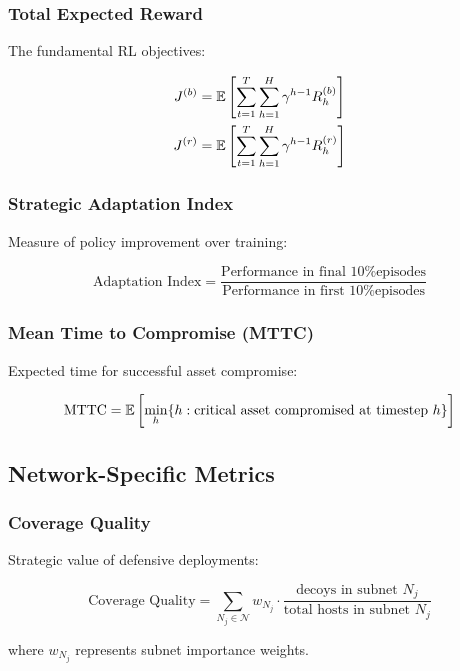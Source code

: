 \documentclass[12pt]{article}
\theoremstyle{definition}
\theoremstyle{plain}
\begin{document}
\subsubsection{Total Expected Reward}
The fundamental RL objectives:

\begin{align}
J^{(b)} &= \mathbb{E}\left[\sum_{t=1}^{T} \sum_{h=1}^{H} \gamma^{h-1} R_h^{(b)}\right] \\
J^{(r)} &= \mathbb{E}\left[\sum_{t=1}^{T} \sum_{h=1}^{H} \gamma^{h-1} R_h^{(r)}\right]
\end{align}

\subsubsection{Strategic Adaptation Index}
Measure of policy improvement over training:

\begin{equation}
\text{Adaptation Index} = \frac{\text{Performance in final 10\% episodes}}{\text{Performance in first 10\% episodes}}
\end{equation}

\subsubsection{Mean Time to Compromise (MTTC)}
Expected time for successful asset compromise:

\begin{equation}
\text{MTTC} = \mathbb{E}\left[\min_h \{h : \text{critical asset compromised at timestep } h\}\right]
\end{equation}

\subsection{Network-Specific Metrics}

\subsubsection{Coverage Quality}
Strategic value of defensive deployments:

\begin{equation}
\text{Coverage Quality} = \sum_{N_j \in \mathcal{N}} w_{N_j} \cdot \frac{\text{decoys in subnet } N_j}{\text{total hosts in subnet } N_j}
\end{equation}

where $w_{N_j}$ represents subnet importance weights.
\end{document}
